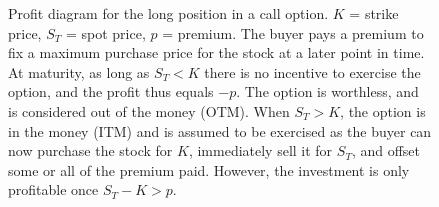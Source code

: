 \documentclass[english,12pt,a4paper,pdftex,sci,utf8]{aaltothesis}
\begin{document}
\begin{center}
\begin{figure}[H]
\centering
    \caption{Profit diagram for the long position in a call option. $K$ = strike price, $S_T$ = spot price, $p$ = premium. The buyer pays a premium to fix a maximum purchase price for the stock at a later point in time. At maturity, as long as $S_T < K$ there is no incentive to exercise the option, and the profit thus equals $-p$. The option is worthless, and is considered out of the money (OTM). When $S_T > K$, the option is in the money (ITM) and is assumed to be exercised as the buyer can now purchase the stock for $K$, immediately sell it for $S_T$, and offset some or all of the premium paid. However, the investment is only profitable once $S_T - K > p$.}
    \label{fig:long_call_payoff}
\end{figure}
\end{center}
\end{document}
